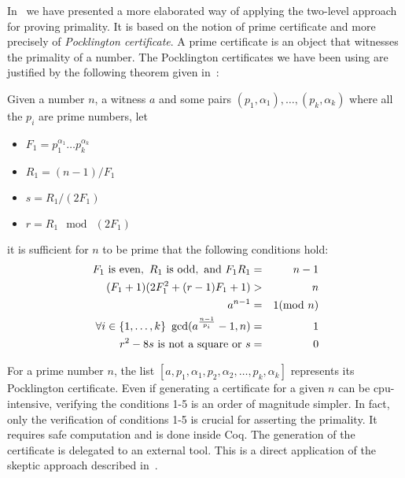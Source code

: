 In~\cite{GreTheWer} we have presented a more elaborated way of applying 
the two-level approach for proving primality. It is based on the
notion of prime certificate and more precisely of {\it Pocklington certificate}.
A prime certificate is an object that witnesses the primality of a number.
The Pocklington certificates we have been using are justified by the following
theorem given in~\cite{lehmer}:
\begin{theorem}\label{lehmer}
Given a number $n$, a witness $a$ and some pairs $(p_1,\alpha_1),\dots,(p_k,\alpha_k)$
 where all the $p_i$ are prime numbers,
 let
 \begin{itemize}
\item[]$F_1 = p_1^{\alpha_1}\dots p_k^{\alpha_k}$
\item[]$R_1 = (n - 1) / F_1$
\item[]$ s = R_1 / (2F_1)$
\item[] $r = R_1 \mod\ (2F_1)$
 \end{itemize}
 it is sufficient for $n$ to be prime that the following conditions hold:
\begin{eqnarray}
F_1 \,\,\hbox{is even},\,\,
R_1 \,\, \hbox{is odd}, \,\,\hbox{and}\,\,
F_1R_1  &=&  n -1\\
(F_1 + 1) (2F_1^2 + (r - 1) F_1 + 1) & >& n\\
a^{n-1} &=& 1 (\mod\ n)\\
\forall i\in\{1,\dots,k\}~\gcd(a^{\frac{n-1}{p_i}}-1,n)&=&1\\
r^2 - 8 s\,\,\mbox{is not a square}\,\,\hbox{or}\,\,s &=& 0
\end{eqnarray}
\end{theorem}
For a prime number $n$, the list $[a, p_1, \alpha_1, p_2, \alpha_2, \dots, p_k, \alpha_k]$
represents its Pocklington certificate.
Even if generating a certificate for a given $n$ can be cpu-intensive, verifying
the conditions 1-5 is an order of magnitude simpler. In fact, only
the verification of conditions 1-5 is crucial for asserting the primality. It requires
safe computation and is done inside {\sc Coq}.
The generation of the certificate is delegated to an external tool.
This is a direct application of the skeptic approach described in~\cite{BarBar,HarThe}.
                 
